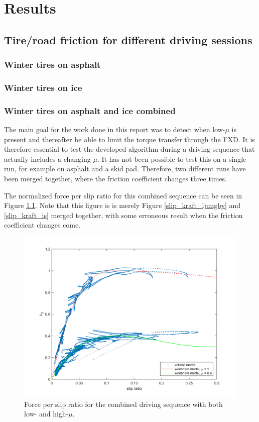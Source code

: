\chapter{Results}

\section{Tire/road friction for different driving sessions}

\subsection{Winter tires on asphalt}

\subsection{Winter tires on ice}

\subsection{Winter tires on asphalt and ice combined}
The main goal for the work done in this report was to detect when low-$ \mu $ is present and thereafter be able to limit the torque transfer through the FXD. It is therefore essential to test the developed algorithm during a driving sequence that actually includes a changing $ \mu $. It has not been possible to test this on a single run, for example on asphalt and a skid pad. Therefore, two different runs have been merged together, where the friction coefficient changes three times.

The normalized force per slip ratio for this combined sequence can be seen in Figure \ref{slip_kraft_comb2}. Note that this figure is is merely Figure \ref{slip_kraft_ljungby} and \ref{slip_kraft_is} merged together, with some erroneous result when the friction coefficient changes come. 

\begin{figure}[h]
	\centering
	\includegraphics[width=1.0\textwidth]{Pictures/slip_kraft_comb2}
	\caption {Force per slip ratio for the combined driving sequence with both low- and high-$ \mu $.}
	\label{slip_kraft_comb2}
\end{figure}

